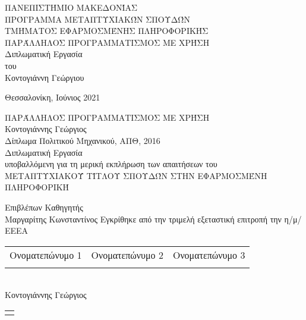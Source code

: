 \begin{center}

\textsc{ ΠΑΝΕΠΙΣΤΉΜΙΟ ΜΑΚΕΔΟΝΊΑΣ\\[0.3 cm]
ΠΡΌΓΡΑΜΜΑ ΜΕΤΑΠΤΥΧΙΑΚΏΝ ΣΠΟΥΔΏΝ\\[0.3 cm]
ΤΜΉΜΑΤΟΣ ΕΦΑΡΜΟΣΜΈΝΗΣ ΠΛΗΡΟΦΟΡΙΚΉΣ}\\[2.5 cm]
{ \large ΠΑΡΆΛΛΗΛΟΣ ΠΡΟΓΡΑΜΜΑΤΙΣΜΟΣ ΜΕ ΧΡΉΣΗ \\[0.4 cm] } Διπλωματική Εργασία\\[1 cm]
του\\[0.5 cm]
\large
Κοντογιάννη Γεώργιου
\begin{minipage}{0.4\textwidth}
\end{minipage}
\vfill
{\large Θεσσαλονίκη, Ιούνιος 2021}

 \end{center}
 
\newpage
\mbox{}


\newpage
{}
\setcounter{page}{3} 

 \begin{center}
{\large {ΠΑΡΆΛΛΗΛΟΣ ΠΡΟΓΡΑΜΜΑΤΙΣΜΟΣ ΜΕ ΧΡΉΣΗ }}\\[2 cm]
Κοντογιάννης Γεώργιος\\[0.5 cm]
Δίπλωμα Πολιτικού Μηχανικού, ΑΠΘ, 2016\\[2 cm]
Διπλωματική Εργασία\\[0.5 cm]
υποβαλλόμενη για τη μερική εκπλήρωση των απαιτήσεων του\\[0.5 cm]
ΜΕΤΑΠΤΥΧΙΑΚΟΎ ΤΊΤΛΟΥ ΣΠΟΥΔΏΝ ΣΤΗΝ ΕΦΑΡΜΟΣΜΈΝΗ ΠΛΗΡΟΦΟΡΙΚΉ\\[2 cm]
\begin{flushleft}
Επιβλέπων Καθηγητής\\
Μαργαρίτης Κωνσταντίνος
\vfill
Εγκρίθηκε από την τριμελή εξεταστική επιτροπή την η/μ/ΕΕΕΑ\\[0.5 cm]
\begin{tabular}{  p{} 
                   p{} p{}
                   } Ονοματεπώνυμο 1 & Ονοματεπώνυμο 2  & Ονοματεπώνυμο 3 \\[1 cm]
\dotfill & \dotfill  & \dotfill \\
\end{tabular}\\[2 cm]
Κοντογιάννης Γεώργιος \\[0.5 cm]
\begin{tabular}{  p{}   }
\dotfill
\end{tabular}\\[1 cm]
\end{flushleft}
\end{center}
  
